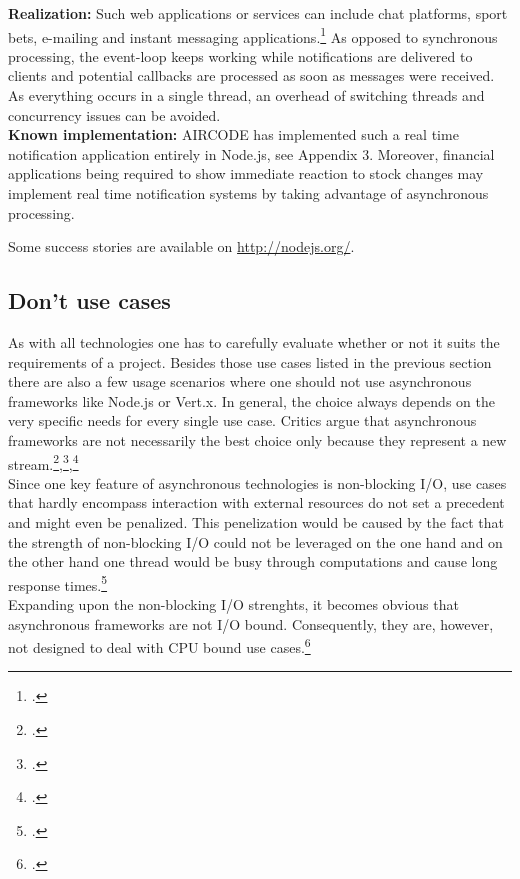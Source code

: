 \begin{description}
\textbf{Realization:} Such web applications or services can include chat platforms, sport bets, e-mailing and instant messaging applications.\footcite[Cf.][]{GeisendoerferF_2011} As opposed to synchronous processing, the event-loop keeps working while notifications are delivered to clients and potential callbacks are processed as soon as messages were received. As everything occurs in a single thread, an overhead of switching threads and concurrency issues can be avoided.\\
\textbf{Known implementation:} AIRCODE has implemented such a real time notification application entirely in Node.js, see Appendix 3. Moreover, financial applications being required to show immediate reaction to stock changes may implement real time notification systems by taking advantage of asynchronous processing.


\end{description}

Some success stories are available on \url{http://nodejs.org/}.

\subsection{Don't use cases}
\label{dont_use_cases}

As with all technologies one has to carefully evaluate whether or not it suits the
requirements of a project. Besides those use cases listed in the previous
section there are also a few usage scenarios where one should not use
asynchronous frameworks like Node.js or Vert.x. In general, the choice
always depends on the very specific needs for every single use case.
Critics argue that asynchronous frameworks are not necessarily the best choice
only because they represent a new stream.\footcite[Cf.][]{semerau_2011},\footcite[Cf.][]{arranz_2011},\footcite[Cf.][]{behren_2003}\\

Since one key feature of asynchronous technologies is non-blocking I/O, use
cases that hardly encompass interaction with external resources do not set a
precedent and might even be penalized. This penelization would be caused by the
fact that the strength of non-blocking I/O could not be leveraged on the one
hand and on the other hand one thread would be busy through computations and
cause long response times.\footcite[Cf.][14]{Roden_2012}\\

Expanding upon the non-blocking I/O strenghts, it becomes obvious that
asynchronous frameworks are not I/O bound. Consequently, they are, however, not
designed to deal with CPU bound use cases.\footcite[Cf.][15]{Nguyen_2012}\\

